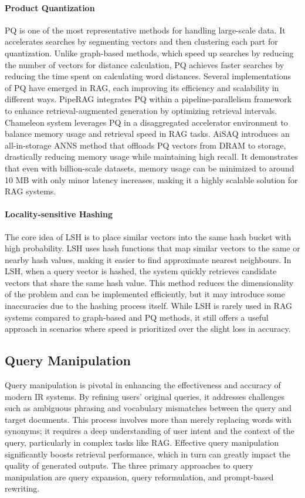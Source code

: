 \paragraph{Product Quantization} PQ is one of the most representative methods for handling large-scale data. It accelerates searches by segmenting vectors and then clustering each part for quantization. Unlike graph-based methods, which speed up searches by reducing the number of vectors for distance calculation, PQ achieves faster searches by reducing the time spent on calculating word distances. Several implementations of PQ have emerged in RAG, each improving its efficiency and scalability in different ways. PipeRAG \cite{jiang2024piperag} integrates PQ within a pipeline-parallelism framework to enhance retrieval-augmented generation by optimizing retrieval intervals. Chameleon system \cite{jiang2023chameleon} leverages PQ in a disaggregated accelerator environment to balance memory usage and retrieval speed in RAG tasks. AiSAQ \cite{tatsuno2024aisaq} introduces an all-in-storage ANNS method that offloads PQ vectors from DRAM to storage, drastically reducing memory usage while maintaining high recall. It demonstrates that even with billion-scale datasets, memory usage can be minimized to around 10 MB with only minor latency increases, making it a highly scalable solution for RAG systems. 

\paragraph{Locality-sensitive Hashing} The core idea of LSH is to place similar vectors into the same hash bucket with high probability. LSH uses hash functions that map similar vectors to the same or nearby hash values, making it easier to find approximate nearest neighbours. In LSH, when a query vector is hashed, the system quickly retrieves candidate vectors that share the same hash value. This method reduces the dimensionality of the problem and can be implemented efficiently, but it may introduce some inaccuracies due to the hashing process itself. While LSH is rarely used in RAG systems compared to graph-based and PQ methods, it still offers a useful approach in scenarios where speed is prioritized over the slight loss in accuracy.

\subsection{Query Manipulation}
Query manipulation is pivotal in enhancing the effectiveness and accuracy of modern IR systems. By refining users' original queries, it addresses challenges such as ambiguous phrasing and vocabulary mismatches between the query and target documents. This process involves more than merely replacing words with synonyms; it requires a deep understanding of user intent and the context of the query, particularly in complex tasks like RAG. Effective query manipulation significantly boosts retrieval performance, which in turn can greatly impact the quality of generated outputs. The three primary approaches to query manipulation are query expansion, query reformulation, and prompt-based rewriting.

